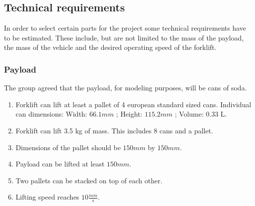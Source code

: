 \documentclass[../report.tex]{subfiles}
\begin{document}
    \subsection{Technical requirements}
        In order to select certain parts for the project some technical requirements 
        have to be estimated. These include, but are not limited to the mass of the 
        payload, the mass of the vehicle and the desired operating speed of the 
        forklift.

        \subsubsection{Payload} %
           The group agreed that the payload, for modeling purposes, will be cans of soda.
           \begin{center}
                \begin{enumerate}
                    \item Forklift can lift at least a pallet of 4 european standard sized cans. Individual can dimensions: Width: $66.1mm$ ; Height: $115.2mm$ ; Volume: 0.33 L. %
                    \item Forklift can lift  3.5 kg of mass. This includes 8 cans and a pallet. %
                    \item Dimensions of the pallet should be $150mm$ by $150mm$. %
                    \item Payload can be lifted at least $150mm$. %
                    \item Two pallets can be stacked on top of each other.
                    \item Lifting speed reaches $10  \frac{mm}{s}$. %
                \end{enumerate}
            \end{center}
\end{document}
